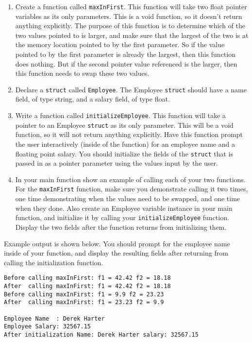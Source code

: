 \documentclass[11pt]{article}
\begin{document}
\begin{enumerate}
\item Create a function called \verb~maxInFirst~.  This function will take two
   float pointer variables as its only parameters.  This is a void
   function, so it doesn't return anything explicitly.  The purpose of
   this function is to determine which of the two values pointed to is
   larger, and make sure that the largest of the two is at the memory
   location pointed to by the first parameter.  So if the value
   pointed to by the first parameter is already the largest, then this
   function does nothing.  But if the second pointer value referenced
   is the larger, then this function needs to swap these two values.
\item Declare a \verb~struct~ called \verb~Employee~.  The Employee \verb~struct~ should
   have a name field, of type string, and a salary field, of type
   float.
\item Write a function called \verb~initializeEmployee~.  This function
   will take a pointer to an Employee \verb~struct~ as its only parameter.
   This will be a void function, so it will not return anything
   explicitly.  Have this function prompt the user interactively
   (inside of the function) for an employee name and a floating
   point salary.  You should initialize the fields of the \verb~struct~
   that is passed in as a pointer parameter using the values
   input by the user.
\item In your main function show an example of calling each of your two 
   functions.  For the \verb~maxInFirst~ function, make sure you demonstrate
   calling it two times, one time demonstrating when the values need
   to be swapped, and one time when they done.  Also create an
   Employee variable instance in your main function, and initialize it
   by calling your \verb~initializeEmployee~ function.  Display the two
   fields after the function returns from initializing them.
\end{enumerate}

Example output is shown below.  You should prompt for the employee
name inside of your function, and display the resulting fields after
returning from calling the initialization function.



\begin{verbatim}
Before calling maxInFirst: f1 = 42.42 f2 = 18.18
After  calling maxInFirst: f1 = 42.42 f2 = 18.18
Before calling maxInFirst: f1 = 9.9 f2 = 23.23
After  calling maxInFirst: f1 = 23.23 f2 = 9.9

Employee Name  : Derek Harter
Employee Salary: 32567.15
After initialization Name: Derek Harter salary: 32567.15
\end{verbatim}
\end{document}
